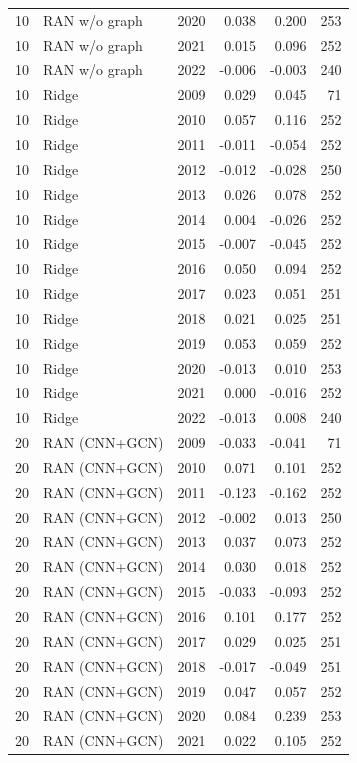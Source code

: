 \begin{table}[htbp]
{\begin{tabular}{llrrrr}
10 & RAN w/o graph & 2020 & 0.038 & 0.200 & 253 \\
10 & RAN w/o graph & 2021 & 0.015 & 0.096 & 252 \\
10 & RAN w/o graph & 2022 & -0.006 & -0.003 & 240 \\
10 & Ridge & 2009 & 0.029 & 0.045 & 71 \\
10 & Ridge & 2010 & 0.057 & 0.116 & 252 \\
10 & Ridge & 2011 & -0.011 & -0.054 & 252 \\
10 & Ridge & 2012 & -0.012 & -0.028 & 250 \\
10 & Ridge & 2013 & 0.026 & 0.078 & 252 \\
10 & Ridge & 2014 & 0.004 & -0.026 & 252 \\
10 & Ridge & 2015 & -0.007 & -0.045 & 252 \\
10 & Ridge & 2016 & 0.050 & 0.094 & 252 \\
10 & Ridge & 2017 & 0.023 & 0.051 & 251 \\
10 & Ridge & 2018 & 0.021 & 0.025 & 251 \\
10 & Ridge & 2019 & 0.053 & 0.059 & 252 \\
10 & Ridge & 2020 & -0.013 & 0.010 & 253 \\
10 & Ridge & 2021 & 0.000 & -0.016 & 252 \\
10 & Ridge & 2022 & -0.013 & 0.008 & 240 \\
20 & RAN (CNN+GCN) & 2009 & -0.033 & -0.041 & 71 \\
20 & RAN (CNN+GCN) & 2010 & 0.071 & 0.101 & 252 \\
20 & RAN (CNN+GCN) & 2011 & -0.123 & -0.162 & 252 \\
20 & RAN (CNN+GCN) & 2012 & -0.002 & 0.013 & 250 \\
20 & RAN (CNN+GCN) & 2013 & 0.037 & 0.073 & 252 \\
20 & RAN (CNN+GCN) & 2014 & 0.030 & 0.018 & 252 \\
20 & RAN (CNN+GCN) & 2015 & -0.033 & -0.093 & 252 \\
20 & RAN (CNN+GCN) & 2016 & 0.101 & 0.177 & 252 \\
20 & RAN (CNN+GCN) & 2017 & 0.029 & 0.025 & 251 \\
20 & RAN (CNN+GCN) & 2018 & -0.017 & -0.049 & 251 \\
20 & RAN (CNN+GCN) & 2019 & 0.047 & 0.057 & 252 \\
20 & RAN (CNN+GCN) & 2020 & 0.084 & 0.239 & 253 \\
20 & RAN (CNN+GCN) & 2021 & 0.022 & 0.105 & 252 \\

\end{tabular}}
\end{table}
